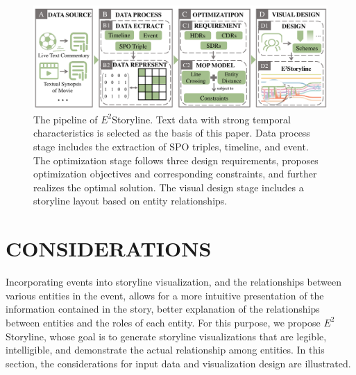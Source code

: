 \documentclass[review,journal]{vgtc}         %
\begin{document}
\begin{figure}[h]
	\centering
	\includegraphics[width=\textwidth]{Fig/overview.pdf}
	\vspace{-1em}
	\caption{The pipeline of $E^2$Storyline. Text data with strong temporal characteristics is selected as the basis of this paper. Data process stage includes the extraction of SPO triples, timeline, and event. The optimization stage follows three design requirements, proposes optimization objectives and corresponding constraints, and further realizes the optimal solution. The visual design stage includes a storyline layout based on entity relationships.}
	\vspace{-1em}
	\label{fig:overview}
\end{figure}


\section{CONSIDERATIONS}
\noindent Incorporating events into storyline visualization, and the relationships between various entities in the event, allows for a more intuitive presentation of the information contained in the story, better explanation of the relationships between entities and the roles of each entity. For this purpose, we propose $E^2$Storyline, whose goal is to generate storyline visualizations that are legible, intelligible, and demonstrate the actual relationship among entities. In this section, the considerations for input data and visualization design are illustrated.
\end{document}

